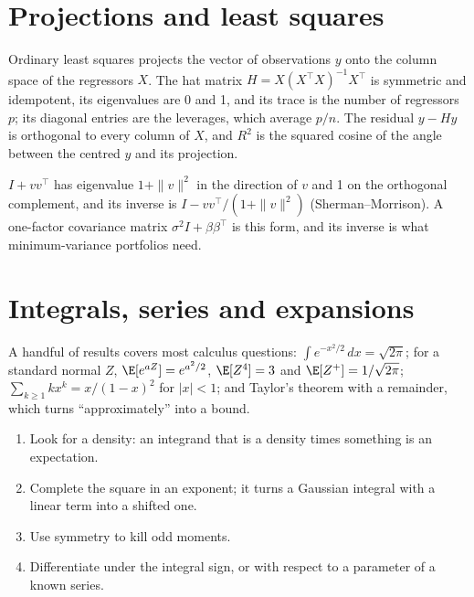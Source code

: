 \section{Projections and least squares}

Ordinary least squares projects the vector of observations $y$ onto the column space of the regressors $X$. The hat
matrix $H = X(X^\top X)^{-1}X^\top$ is symmetric and idempotent, its eigenvalues are 0 and 1, and its trace is the number
of regressors $p$; its diagonal entries are the leverages, which average $p/n$. The residual $y - Hy$ is orthogonal to
every column of $X$, and $R^2$ is the squared cosine of the angle between the centred $y$ and its projection.

\begin{example}\label{ex:iv:linear-algebra-and-calculus:rankone}
$I + vv^\top$ has eigenvalue $1 + \|v\|^2$ in the direction of $v$ and 1 on the orthogonal complement, and its
inverse is $I - vv^\top/(1 + \|v\|^2)$ (Sherman--Morrison). A one-factor covariance matrix $\sigma^2 I + \beta\beta^\top$
is this form, and its inverse is what minimum-variance portfolios need.
\end{example}

\section{Integrals, series and expansions}

A handful of results covers most calculus questions: $\int e^{-x^2/2}\,dx = \sqrt{2\pi}$; for a standard normal $Z$,
$\E[e^{aZ}] = e^{a^2/2}$, $\E[Z^4] = 3$ and $\E[Z^+] = 1/\sqrt{2\pi}$; $\sum_{k \ge 1} k x^k = x/(1-x)^2$ for $|x| < 1$;
and Taylor's theorem with a remainder, which turns ``approximately'' into a bound.

\begin{method}\label{met:iv:linear-algebra-and-calculus:integrals}
\begin{enumerate}
\item Look for a density: an integrand that is a density times something is an expectation.
\item Complete the square in an exponent; it turns a Gaussian integral with a linear term into a shifted one.
\item Use symmetry to kill odd moments.
\item Differentiate under the integral sign, or with respect to a parameter of a known series.
\end{enumerate}
\end{method}

